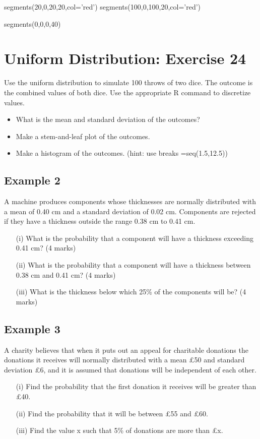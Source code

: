 \documentclass[12pt]{report}
\begin{document}
segments(20,0,20,20,col='red')
segments(100,0,100,20,col='red')

segments(0,0,0,40)

\section*{Uniform Distribution: Exercise 24}

Use the uniform distribution to simulate 100 throws of two dice. The outcome is the combined values of both dice. Use the appropriate R command to discretize values.
\begin{itemize}
	\item  What is the mean and standard deviation of the outcomes?
	\item  Make a stem-and-leaf plot of the outcomes.
	\item Make a histogram of the outcomes. (hint: use breaks =seq(1.5,12.5))
\end{itemize}



\subsection{Example 2}
A machine produces components whose thicknesses are normally
distributed with a mean of 0.40 cm and a standard deviation of 0.02 cm.
Components are rejected if they have a thickness outside the range 0.38 cm
to 0.41 cm.
\begin{itemize}
\item[(i)] What is the probability that a component will have a thickness
exceeding 0.41 cm? (4 marks)
\item[(ii)] What is the probability that a component will have a thickness between
0.38 cm and 0.41 cm? (4 marks)
\item[(iii)] What is the thickness below which 25\% of the components will be? (4 marks)
\end{itemize}

\subsection{Example 3}
A charity believes that when it puts out an appeal for charitable donations the
donations it receives will normally distributed with a mean £50 and standard
deviation £6, and it is assumed that donations will be independent of each
other.
\begin{itemize}
	\item[(i)] Find the probability that the first donation it receives will be greater
	than £40.
	\item[(ii)] Find the probability that it will be between £55 and £60.
	\item[(iii)] Find the value x such that 5\% of donations are more than £x.
\end{itemize}
\end{document}

